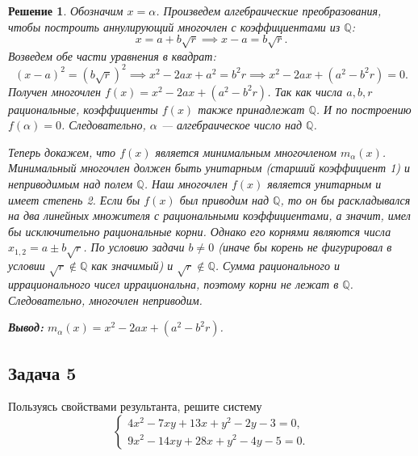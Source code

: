 \documentclass[14pt]{article}
\newtheorem*{solution}{Решение}
\begin{document}
	\begin{solution}
		Обозначим $x = \alpha$. Произведем алгебраические преобразования, чтобы построить аннулирующий многочлен с коэффициентами из $\mathbb Q$:
		\[
		x = a + b\sqrt{r} \implies x - a = b\sqrt{r}.
		\]
		Возведем обе части уравнения в квадрат:
		\[
		(x - a)^2 = (b\sqrt{r})^2 \implies x^2 - 2ax + a^2 = b^2r \implies x^2 - 2ax + (a^2 - b^2r) = 0.
		\]
		Получен многочлен $f(x) = x^2 - 2ax + (a^2 - b^2r)$. Так как числа $a, b, r$ рациональные, коэффициенты $f(x)$ также принадлежат $\mathbb Q$. И по построению $f(\alpha) = 0$. Следовательно, $\alpha$ — алгебраическое число над $\mathbb Q$.
		
		Теперь докажем, что $f(x)$ является минимальным многочленом $m_\alpha(x)$. Минимальный многочлен должен быть унитарным (старший коэффициент 1) и неприводимым над полем $\mathbb Q$. Наш многочлен $f(x)$ является унитарным и имеет степень 2.
		Если бы $f(x)$ был приводим над $\mathbb Q$, то он бы раскладывался на два линейных множителя с рациональными коэффициентами, а значит, имел бы исключительно рациональные корни. 
		Однако его корнями являются числа $x_{1,2} = a \pm b\sqrt{r}$. По условию задачи $b \neq 0$ (иначе бы корень не фигурировал в условии $\sqrt{r} \notin \mathbb{Q}$ как значимый) и $\sqrt{r} \notin \mathbb{Q}$. Сумма рационального и иррационального чисел иррациональна, поэтому корни не лежат в $\mathbb Q$. Следовательно, многочлен неприводим.
		
		\textbf{Вывод:} $m_\alpha(x) = x^2 - 2ax + (a^2 - b^2r)$.
	\end{solution}
	
	\subsection*{Задача 5}
	Пользуясь свойствами результанта, решите систему
	\[
	\begin{cases}
		4x^2 - 7xy + 13x + y^2 - 2y - 3 = 0,\\
		9x^2 - 14xy + 28x + y^2 - 4y - 5 = 0.
	\end{cases}
	\]
	
\end{document}

